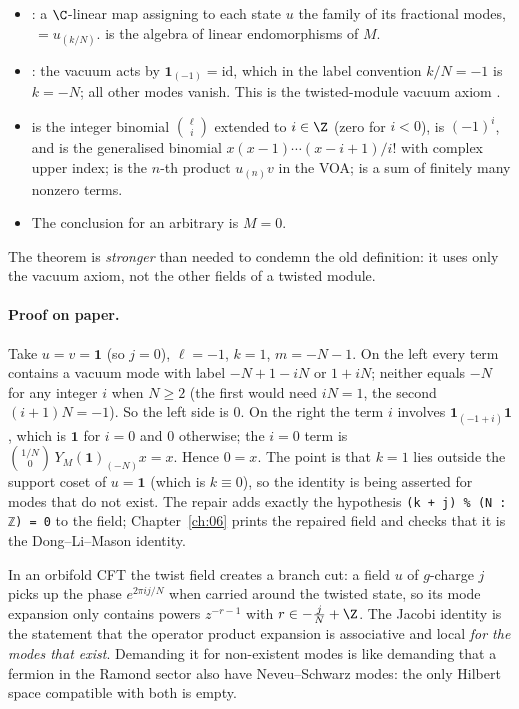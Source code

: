 \begin{dictionary}
\begin{itemize}
\item {}: a $\C$-linear map assigning to each state $u$ the family
  of its fractional modes, $\,=u_{(k/N)}$.  is the algebra of linear
  endomorphisms of $M$.
\item {}: the vacuum acts by $\mathbf 1_{(-1)}=\mathrm{id}$, which in the label convention
  $k/N=-1$ is $k=-N$; all other modes vanish. This is the twisted-module vacuum axiom
  .
\item {} is the integer binomial $\binom{\ell}{i}$ extended to $i\in\Z$ (zero for
  $i<0$),  is $(-1)^i$, and  is the generalised binomial
  $x(x-1)\cdots(x-i+1)/i!$ with complex upper index;  is the $n$-th product
  $u_{(n)}v$ in the VOA;  is a sum of finitely many nonzero terms.
\item The conclusion  for an arbitrary  is $M=0$.
\end{itemize}
The theorem is \emph{stronger} than needed to condemn the old definition: it uses only the vacuum
axiom, not the other fields of a twisted module.
\end{dictionary}

\paragraph{Proof on paper.} Take $u=v=\mathbf 1$ (so $j=0$), $\ell=-1$, $k=1$, $m=-N-1$. On the left
every term contains a vacuum mode with label $-N+1-iN$ or $1+iN$; neither equals $-N$ for any
integer $i$ when $N\ge 2$ (the first would need $iN=1$, the second $(i+1)N=-1$). So the left side is
$0$. On the right the term $i$ involves $\mathbf 1_{(-1+i)}\mathbf 1$, which is $\mathbf 1$ for $i=0$
and $0$ otherwise; the $i=0$ term is $\binom{1/N}{0}\,Y_M(\mathbf 1)_{(-N)}x=x$. Hence $0=x$.
The point is that $k=1$ lies outside the support coset of $u=\mathbf 1$ (which is $k\equiv 0$), so
the identity is being asserted for modes that do not exist. The repair adds exactly the hypothesis
\texttt{(k + j) \% (N : ℤ) = 0} to the field; Chapter~\ref{ch:06} prints the repaired field and
checks that it is the Dong--Li--Mason identity.

\begin{physics}
In an orbifold CFT the twist field creates a branch cut: a field $u$ of $g$-charge $j$ picks up
the phase $e^{2\pi i j/N}$ when carried around the twisted state, so its mode expansion only
contains powers $z^{-r-1}$ with $r\in-\frac jN+\Z$. The Jacobi identity is the statement that the
operator product expansion is associative and local \emph{for the modes that exist}. Demanding it
for non-existent modes is like demanding that a fermion in the Ramond sector also have
Neveu--Schwarz modes: the only Hilbert space compatible with both is empty.
\end{physics}

